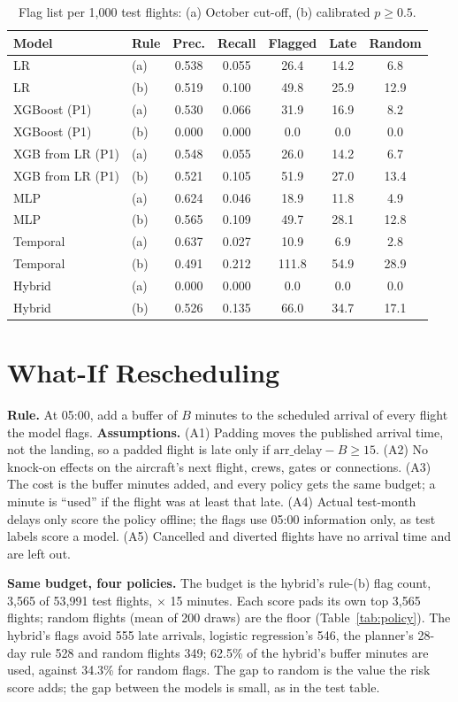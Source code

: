 \documentclass[conference]{IEEEtran}
\begin{document}
\begin{table}[t]\centering\caption{Flag list per 1,000 test flights: (a) October cut-off, (b) calibrated $p\geq0.5$.}\label{tab:biz}
\setlength{\tabcolsep}{2pt}\footnotesize\begin{tabular}{llccccc}\toprule
Model & Rule & Prec. & Recall & Flagged & Late & Random\\\midrule
LR & (a) & 0.538 & 0.055 & 26.4 & 14.2 & 6.8\\
LR & (b) & 0.519 & 0.100 & 49.8 & 25.9 & 12.9\\
XGBoost (P1) & (a) & 0.530 & 0.066 & 31.9 & 16.9 & 8.2\\
XGBoost (P1) & (b) & 0.000 & 0.000 & 0.0 & 0.0 & 0.0\\
XGB from LR (P1) & (a) & 0.548 & 0.055 & 26.0 & 14.2 & 6.7\\
XGB from LR (P1) & (b) & 0.521 & 0.105 & 51.9 & 27.0 & 13.4\\
MLP & (a) & 0.624 & 0.046 & 18.9 & 11.8 & 4.9\\
MLP & (b) & 0.565 & 0.109 & 49.7 & 28.1 & 12.8\\
Temporal & (a) & 0.637 & 0.027 & 10.9 & 6.9 & 2.8\\
Temporal & (b) & 0.491 & 0.212 & 111.8 & 54.9 & 28.9\\
Hybrid & (a) & 0.000 & 0.000 & 0.0 & 0.0 & 0.0\\
Hybrid & (b) & 0.526 & 0.135 & 66.0 & 34.7 & 17.1\\
\bottomrule\end{tabular}\end{table}

\section{What-If Rescheduling}
\textbf{Rule.} At 05:00, add a buffer of $B$ minutes to the scheduled arrival of every flight the model flags. \textbf{Assumptions.} (A1) Padding moves the published arrival time, not the landing, so a padded flight is late only if $\text{arr\_delay} - B \geq 15$. (A2) No knock-on effects on the aircraft's next flight, crews, gates or connections. (A3) The cost is the buffer minutes added, and every policy gets the same budget; a minute is ``used'' if the flight was at least that late. (A4) Actual test-month delays only score the policy offline; the flags use 05:00 information only, as test labels score a model. (A5) Cancelled and diverted flights have no arrival time and are left out.

\textbf{Same budget, four policies.} The budget is the hybrid's rule-(b) flag count, 3,565 of 53,991 test flights, $\times$ 15 minutes. Each score pads its own top 3,565 flights; random flights (mean of 200 draws) are the floor (Table~\ref{tab:policy}). The hybrid's flags avoid 555 late arrivals, logistic regression's 546, the planner's 28-day rule 528 and random flights 349; 62.5\% of the hybrid's buffer minutes are used, against 34.3\% for random flags. The gap to random is the value the risk score adds; the gap between the models is small, as in the test table.
\end{document}

